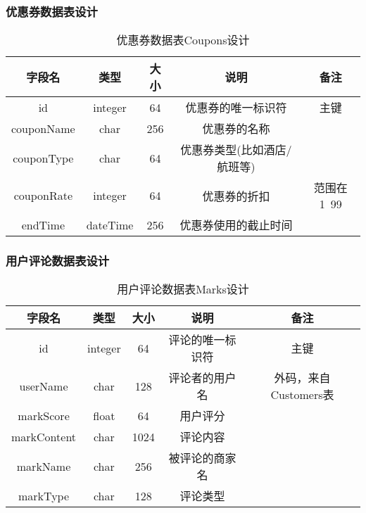 \subsubsection{优惠券数据表设计}
\begin{table}[H]
\centering
\caption{优惠券数据表Coupons设计} \label{tab:order-database}
\begin{tabular}{|c|c|c|c|c|}
    \hline
    字段名 & 类型 & 大小 & 说明 & 备注 \\
    \hline
    id & integer & 64 & 优惠券的唯一标识符 & 主键\\
    \hline
    couponName & char & 256 & 优惠券的名称 &  \\
    \hline
    couponType & char & 64 & 优惠券类型(比如酒店/航班等) & \\
    \hline
    couponRate & integer & 64 & 优惠券的折扣 & 范围在1~99\\
    \hline
    endTime & dateTime & 256 & 优惠券使用的截止时间 & \\
    \hline
\end{tabular}
\end{table}


\subsubsection{用户评论数据表设计}
\begin{table}[H]
\centering
\caption{用户评论数据表Marks设计} \label{tab:order-database}
\begin{tabular}{|c|c|c|c|c|}
    \hline
    字段名 & 类型 & 大小 & 说明 & 备注 \\
    \hline
    id & integer & 64 & 评论的唯一标识符 & 主键\\
    \hline
    userName & char & 128 & 评论者的用户名 & 外码，来自Customers表 \\
    \hline
    markScore & float & 64 & 用户评分 & \\
    \hline
    markContent & char & 1024 & 评论内容 & \\
    \hline
    markName & char & 256 & 被评论的商家名 & \\
    \hline
    markType & char & 128 & 评论类型 & \\
    \hline
\end{tabular}
\end{table}


